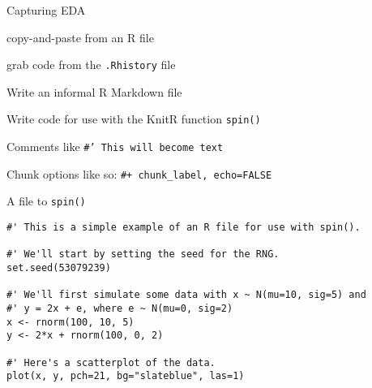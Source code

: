 \documentclass[12pt,t]{beamer}
\begin{document}
\begin{frame}{Capturing EDA}

\vspace{24pt}

\bi
\item copy-and-paste from an R file
\item grab code from the {\tt .Rhistory} file
\item Write an informal R Markdown file
\item Write code for use with the KnitR function {\tt spin()}
\bi
\item[] Comments like \; {\hilit \tt \#' This will become text}
\item[] Chunk options like so: \; {\hilit \tt \#+ chunk\_label, echo=FALSE}
\ei
\ei

\end{frame}


\begin{frame}[fragile]{A file to {\tt spin()}}

\vspace{24pt}

\begin{lstlisting}
#' This is a simple example of an R file for use with spin().

#' We'll start by setting the seed for the RNG.
set.seed(53079239)

#' We'll first simulate some data with x ~ N(mu=10, sig=5) and
#' y = 2x + e, where e ~ N(mu=0, sig=2)
x <- rnorm(100, 10, 5)
y <- 2*x + rnorm(100, 0, 2)

#' Here's a scatterplot of the data.
plot(x, y, pch=21, bg="slateblue", las=1)
\end{lstlisting}

\end{frame}
\end{document}
